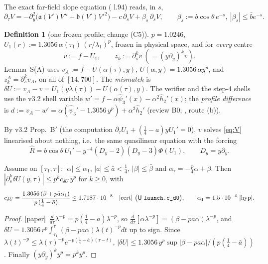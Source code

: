 \documentclass[11pt]{article}
\theoremstyle{definition}\newtheorem{definition}[theorem]{Definition}
\theoremstyle{remark}\newtheorem{remark}[theorem]{Remark}
\newcommand{\fn}[1]{\texttt{\detokenize{#1}}}
\newcommand{\key}[1]{\texttt{\detokenize{#1}}}
\newcommand{\tC}{\textup{[cert]}}\newcommand{\tP}{\textup{[paper]}}\newcommand{\tH}{\textup{[hyp]}}\newcommand{\tE}{\textup{[est]}}
\begin{document}
The exact far-field slope equation (\fn{lemmaS.tex} l.94) reads, in $s$,
\begin{equation}\label{eq:V}
\partial_\tau V=-\partial_y^2\bigl(\mathfrak a(V')V''+\mathfrak b(V')V'^2\bigr)-c\,\partial_sV+\beta_s\,\partial_sV,\qquad \beta_s:=b\cos\theta\,e^{-s},\ |\beta_s|\le\bar be^{-s}.
\end{equation}
\begin{definition}[one frozen profile; change (C5)]\label{def:v}
$p=1.0246$, $U_1(r):=1.3056\,\alpha(\tau_1)\,(r/\lambda_1)^p$, frozen in physical space, and for \emph{every} centre
\[
v:=f-U_1,\qquad z_k:=\partial_s^kv\ (=(y\partial_y)^kv).
\]
Lemma~S(A) uses $v_A:=f-U(\alpha(\tau),y)$, $U(\alpha,y)=1.3056\,\alpha y^p$, and $z^A_k=\partial_s^kv_A$, on all of $[14,700]$. The \emph{mismatch} is $\delta U:=v_A-v=U_1(y\lambda(\tau))-U(\alpha(\tau),y)$.
The verifier and the step-4 shells use the v3.2 shell variable $w'=f-\alpha\hat\psi_3'(x)-\alpha^2\hat h_2'(x)$; the \emph{profile difference} is $d:=v_A-w'=\alpha(\hat\psi_3'-1.3056\,y^p)+\alpha^2\hat h_2'$ (review B0; \fn{B0_REPORT.md}, route (b)).
\end{definition}
By v3.2 Prop.~B$'$ (the computation $\partial_\tau U_1+(\frac14-a)yU_1'=0$), $v$ solves \eqref{eq:V} linearised about nothing, i.e.\ the same quasilinear equation with the forcing
\begin{equation}\label{eq:R}
\hat R=b\cos\theta\,U_1'-y^{-4}(D_y-2)(D_y-3)\Phi(U_1),\qquad D_y=y\partial_y .
\end{equation}
\begin{lemma}\label{lem:dU}
Assume on $[\tau_1,\tau]$: $|\alpha|\le\alpha_1$, $|a|\le\bar a<\frac14$, $|\beta|\le\bar\beta$ and $\alpha_\tau=-\frac p4\alpha+\beta$. Then $|\partial_s^k\delta U(y,\tau)|\le p^kc_{\delta U}\,y^p$ for $k\ge0$, with
\[
c_{\delta U}=\frac{1.3056\,(\bar\beta+p\bar a\alpha_1)}{p\,(\frac14-\bar a)}\le1.7187\cdot10^{-8}\quad\tC\ \bigl(\SU\ \key{launch.c_dU}\bigr),\qquad \alpha_1=1.5\cdot10^{-4}\ \tH.
\]
\end{lemma}
\begin{proof}\tP\ $\frac{d}{d\tau}\lambda^{-p}=p(\frac14-a)\lambda^{-p}$, so $\frac{d}{d\tau}[\alpha\lambda^{-p}]=(\beta-pa\alpha)\lambda^{-p}$, and $\delta U=1.3056\,r^p\int_{\tau_1}^{\tau}(\beta-pa\alpha)\lambda(t)^{-p}dt$ up to sign. Since $\lambda(t)^{-p}\le\lambda(\tau)^{-p}e^{-p(\frac14-\bar a)(\tau-t)}$, $|\delta U|\le1.3056\,y^p\sup|\beta-pa\alpha|/(p(\frac14-\bar a))$. Finally $(y\partial_y)^ky^p=p^ky^p$.
\end{proof}
\end{document}
